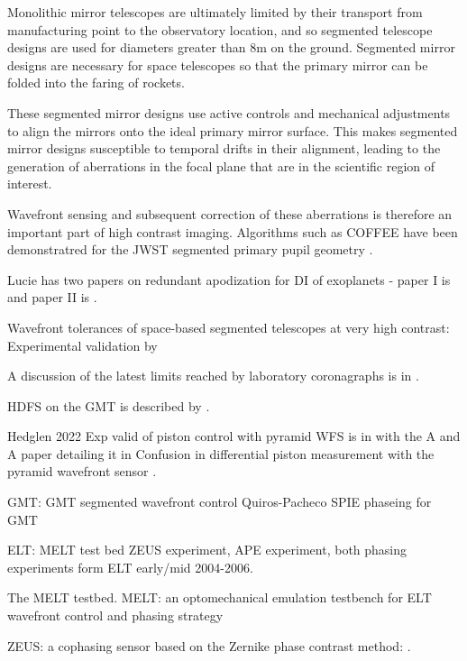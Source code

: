 \documentclass[letterpaper]{ar-1col}
\begin{document}
Monolithic mirror telescopes are ultimately limited by their transport from manufacturing point to the observatory location, and so segmented telescope designs are used for diameters greater than 8m on the ground.
 Segmented mirror designs are necessary for space telescopes so that the primary mirror can be folded into the faring of rockets.

These segmented mirror designs use active controls and mechanical adjustments to align the mirrors onto the ideal primary mirror surface.
%
This makes segmented mirror designs susceptible to temporal drifts in their alignment, leading to the generation of aberrations in the focal plane that are in the scientific region of interest.

Wavefront sensing and subsequent correction of these aberrations is therefore an important part of high contrast imaging.
%
Algorithms such as COFFEE have been demonstratred for the JWST segmented primary pupil geometry \citep{Leboulleux20}.

Lucie has two papers on redundant apodization for DI of exoplanets - paper I is \citep{Leboulleux22} and paper II is \citet{Leboulleux22a}.

Wavefront tolerances of space-based segmented telescopes at very high contrast: Experimental validation by \citet{Laginja22}

A discussion of the latest limits reached by laboratory coronagraphs is in \citet{Mennesson24}.



HDFS on the GMT is described by \citet{Haffert22}.

Hedglen 2022 Exp valid of piston control with pyramid WFS is in \citet{Bertrou-Cantou23} with the A and A paper detailing it in Confusion in differential piston measurement with the pyramid wavefront sensor \citep{Bertrou-Cantou22}.

GMT: GMT segmented wavefront control Quiros-Pacheco SPIE phaseing for GMT \citep{Quiros-Pacheco22}


ELT: MELT test bed ZEUS experiment, APE experiment, both phasing experiments form ELT early/mid 2004-2006.

The MELT testbed. MELT: an optomechanical emulation testbench for ELT wavefront control and phasing strategy \citep{Pfrommer18}

ZEUS: a cophasing sensor based on the Zernike phase contrast method: \citep{Dohlen06}.
\end{document}
